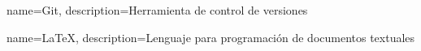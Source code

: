 {
    name=Git,
    description={Herramienta de control de versiones}
}

{
    name=LaTeX,
    description={Lenguaje para programación de documentos textuales}
}

